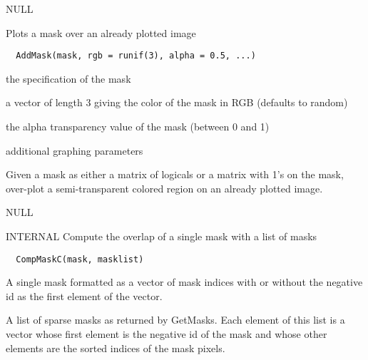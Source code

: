 \documentclass[a4paper]{book}
\begin{document}
%
\begin{Value}
NULL
\end{Value}
%
\begin{Description}\relax
Plots a mask over an already plotted image
\end{Description}
%
\begin{Usage}
\begin{verbatim}
  AddMask(mask, rgb = runif(3), alpha = 0.5, ...)
\end{verbatim}
\end{Usage}
%
\begin{Arguments}
\begin{ldescription}
\item[\code{mask}] the specification of the mask

\item[\code{rgb}] a vector of length 3 giving the color of the
mask in RGB (defaults to random)

\item[\code{alpha}] the alpha transparency value of the mask
(between 0 and 1)

\item[\code{...}] additional graphing parameters
\end{ldescription}
\end{Arguments}
%
\begin{Details}\relax
Given a mask as either a matrix of logicals or a matrix
with 1's on the mask, over-plot a semi-transparent
colored region on an already plotted image.
\end{Details}
%
\begin{Value}
NULL
\end{Value}
%
\begin{Description}\relax
INTERNAL Compute the overlap of a single mask with a list
of masks
\end{Description}
%
\begin{Usage}
\begin{verbatim}
  CompMaskC(mask, masklist)
\end{verbatim}
\end{Usage}
%
\begin{Arguments}
\begin{ldescription}
\item[\code{mask}] A single mask formatted as a vector of mask
indices with or without the negative id as the first
element of the vector.

\item[\code{masklist}] A list of sparse masks as returned by
GetMasks.  Each element of this list is a vector whose
first element is the negative id of the mask and whose
other elements are the sorted indices of the mask
pixels.
\end{ldescription}
\end{Arguments}
\end{document}
